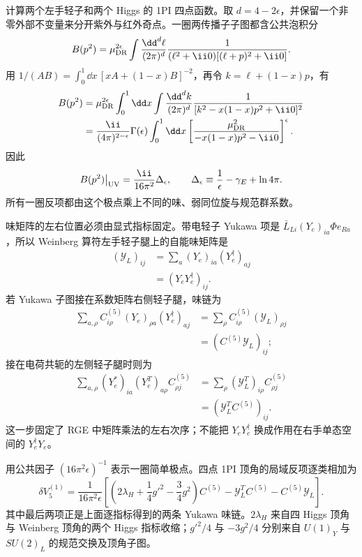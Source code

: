 \begin{derivation}
计算两个左手轻子和两个 Higgs 的 1PI 四点函数。取 $d=4-2\epsilon$，并保留一个非零外部不变量来分开紫外与红外奇点。一圈两传播子子图都含公共泡积分
\begin{equation*}
 B(p^2)=\mu_{\rm DR}^{2\epsilon}
 \int\frac{\dd^d\ell}{(2\pi)^d}
 \frac{1}{(\ell^2+\ii0)[(\ell+p)^2+\ii0]}.
\end{equation*}
用 $1/(AB)=\int_0^1\dd x\,[xA+(1-x)B]^{-2}$，再令 $k=\ell+(1-x)p$，有
\begin{align*}
 B(p^2)
 &=\mu_{\rm DR}^{2\epsilon}\int_0^1\dd x
 \int\frac{\dd^dk}{(2\pi)^d}
 \frac{1}{[k^2-x(1-x)p^2+\ii0]^2}\\
 &=\frac{\ii}{(4\pi)^{2-\epsilon}}\Gamma(\epsilon)
 \int_0^1\dd x
 \left[\frac{\mu_{\rm DR}^2}{-x(1-x)p^2-\ii0}\right]^\epsilon.
\end{align*}
因此
\begin{equation*}
 B(p^2)\big|_{\rm UV}
 =\frac{\ii}{16\pi^2}\Delta_\epsilon,
 \qquad
 \Delta_\epsilon\equiv\frac1\epsilon-\gamma_E+\ln4\pi.
\end{equation*}
所有一圈反项都由这个极点乘上不同的味、弱同位旋与规范群系数。

味矩阵的左右位置必须由显式指标固定。带电轻子 Yukawa 项是 $\bar L_{Li}(Y_e)_{ia}\Phi e_{Ra}$，所以 Weinberg 算符左手轻子腿上的自能味矩阵是
\begin{align*}
 (\mathcal Y_L)_{ij}
 &=\sum_a(Y_e)_{ia}(Y_e^\dagger)_{aj}\\
 &=(Y_eY_e^\dagger)_{ij}.
\end{align*}
若 Yukawa 子图接在系数矩阵右侧轻子腿，味链为
\begin{align*}
 \sum_{a,\rho}C^{(5)}_{i\rho}(Y_e)_{\rho a}(Y_e^\dagger)_{aj}
 &=\sum_\rho C^{(5)}_{i\rho}(\mathcal Y_L)_{\rho j}\\
 &=(C^{(5)}\mathcal Y_L)_{ij};
\end{align*}
接在电荷共轭的左侧轻子腿时则为
\begin{align*}
 \sum_{a,\rho}(Y_e^*)_{ia}(Y_e^T)_{a\rho}C^{(5)}_{\rho j}
 &=\sum_\rho(\mathcal Y_L^T)_{i\rho}C^{(5)}_{\rho j}\\
 &=(\mathcal Y_L^TC^{(5)})_{ij}.
\end{align*}
这一步固定了 RGE 中矩阵乘法的左右次序；不能把 $Y_eY_e^\dagger$ 换成作用在右手单态空间的 $Y_e^\dagger Y_e$。

用公共因子 $(16\pi^2\epsilon)^{-1}$ 表示一圈简单极点。四点 1PI 顶角的局域反项逐类相加为
\begin{equation*}
 \delta V_5^{(1)}
 =\frac{1}{16\pi^2\epsilon}
 \left[
 \left(2\lambda_H+\frac14g'^2-\frac34g^2\right)C^{(5)}
 -\mathcal Y_L^TC^{(5)}-C^{(5)}\mathcal Y_L
 \right].
\end{equation*}
其中最后两项正是上面逐指标得到的两条 Yukawa 味链。$2\lambda_H$ 来自四 Higgs 顶角与 Weinberg 顶角的两个 Higgs 指标收缩；$g'^2/4$ 与 $-3g^2/4$ 分别来自 $U(1)_Y$ 与 $SU(2)_L$ 的规范交换及顶角子图。


\end{derivation}

